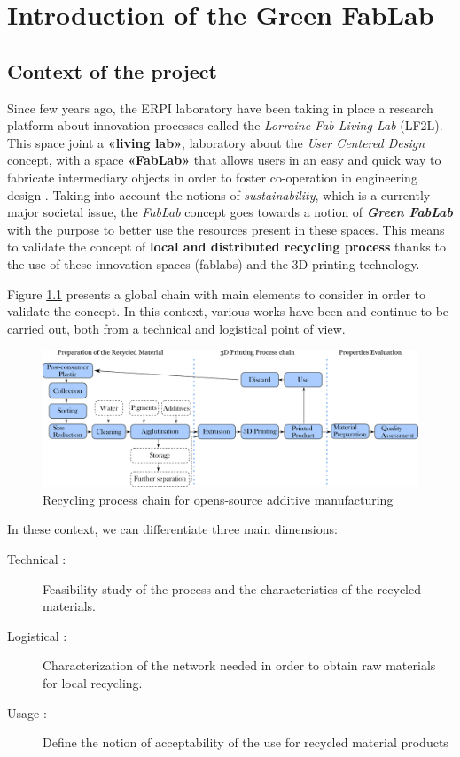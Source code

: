 \chapter{Introduction of the Green FabLab}
\section{Context of the project}

Since few years ago, the ERPI laboratory have been taking in place a research platform about innovation processes called the \textit{Lorraine Fab Living Lab} (LF2L).
This space joint a \textbf{«living lab»}, laboratory about the \textit{User Centered Design} concept, with a space \textbf{«FabLab»} that allows users in an easy and quick way to fabricate intermediary  objects in order to foster co-operation in engineering design \parencite{Boujut2003}.
Taking into account the notions of \textit{sustainability}, which is a currently  major societal issue, the \textit{FabLab} concept goes towards a notion of \textit{\textbf{Green FabLab}} with the purpose to better use  the resources present in these spaces.
This means to validate the concept of \textbf{local and distributed recycling process} thanks to the use of these innovation spaces (fablabs) and the 3D printing technology.

Figure \ref{Context} presents a global chain with main elements to consider in order to validate the concept.
In this context, various works have been and continue to be carried out, both from a technical  and logistical point of view.


\begin{figure}[H]
	\centering
	\includegraphics[width=\textwidth]{Figures/Mechanical-Recycling.pdf}
	\caption{Recycling process chain for opens-source additive manufacturing}
	\label{Context}
\end{figure}


In these context, we can differentiate three main dimensions:

\begin{description}
	\item[Technical :] Feasibility study of the process and the characteristics of the recycled materials.
	\item[Logistical :]  Characterization of the network needed in order to obtain raw materials   for local recycling.
	\item[Usage :] Define the notion of acceptability of the use for recycled material products
\end{description}



